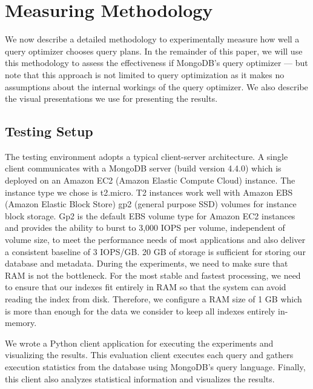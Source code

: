 \section{Measuring Methodology}%
\label{sec:methodology}
We now describe a detailed methodology to experimentally measure how well a query optimizer chooses query plans. In the remainder of this paper, we will use this methodology to assess the effectiveness if MongoDB's \approachName query optimizer --- but note that this approach is not limited to \approachName query optimization as it makes no assumptions about the internal workings of the query optimizer. We also describe the visual presentations we use for presenting the results. %


\subsection{Testing Setup}
The testing environment adopts a typical client-server
architecture. A single client communicates with a MongoDB 
server (build version 4.4.0) which is deployed on an 
Amazon EC2 (Amazon Elastic Compute Cloud) instance. The 
instance type we chose is t2.micro. T2 instances work 
well with Amazon EBS (Amazon Elastic Block Store) gp2 
(general purpose SSD) volumes for instance block storage.
Gp2 is the default EBS volume type for Amazon EC2 instances 
and provides the ability to burst to 3,000 IOPS per volume,
independent of volume size, to meet the performance needs 
of most applications and also deliver a consistent baseline
of 3 IOPS/GB. 20 GB of storage is sufficient for storing 
our database and metadata.  During the experiments, we 
need to make sure that RAM is not the bottleneck.  For 
the most stable and fastest processing,  we need to ensure 
that our indexes fit entirely in RAM so that the system
can avoid reading the index from disk. Therefore, we configure
a RAM size of 1 GB which is more than enough for the data we consider 
to keep all indexes entirely in-memory.

We wrote a Python client application for executing the experiments
and visualizing the results. This evaluation client executes each 
query and gathers execution statistics from the database using MongoDB's query language.
Finally, this client also analyzes statistical information 
and visualizes the results.


